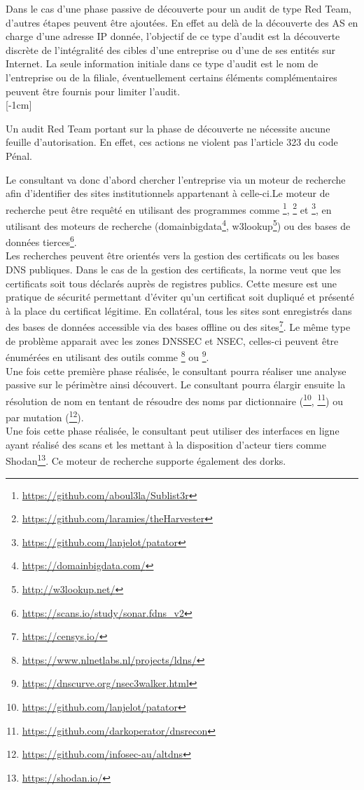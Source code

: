 \documentclass[twoside,a4paper,12pt,titlepage]{book}
\newcommand{\MarginPar}[2]{\marginnote{\scriptsize #1}[#2]}
\begin{document}
Dans le cas d'une phase passive de découverte pour un audit de type Red Team, d'autres étapes peuvent être ajoutées. En effet au delà de la découverte des AS en charge d'une adresse IP donnée, l'objectif de ce type d'audit est la découverte discrète de l'intégralité des cibles d'une entreprise ou d'une de ses entités sur Internet. La seule information initiale dans ce type d'audit est le nom de l'entreprise ou de la filiale, éventuellement certains éléments complémentaires peuvent être fournis pour limiter l'audit.\\\MarginPar{\textbf{Red Team}\index{Red Team}}{-1cm}
\begin{Pre}
Un audit Red Team portant sur la phase de découverte ne nécessite aucune feuille d'autorisation. En effet, ces actions ne violent pas l'article 323 du code Pénal.
\end{Pre}
Le consultant va donc d'abord chercher l'entreprise via un moteur de recherche afin d'identifier des sites institutionnels appartenant à celle-ci.Le moteur de recherche peut être requêté en utilisant des programmes comme \footnote{\url{https://github.com/aboul3la/Sublist3r}}, \footnote{\url{https://github.com/laramies/theHarvester}} et \footnote{\url{https://github.com/lanjelot/patator}}, en utilisant des moteurs de recherche (domainbigdata\footnote{\url{https://domainbigdata.com/}}, w3lookup\footnote{\url{http://w3lookup.net/}}) ou des bases de données tierces\footnote{\url{https://scans.io/study/sonar.fdns_v2}}.\\
Les recherches peuvent être orientés vers la gestion des certificats ou les bases DNS publiques. Dans le cas de la gestion des certificats, la norme veut que les certificats soit tous déclarés auprès de registres publics. Cette mesure est une pratique de sécurité permettant d'éviter qu'un certificat soit dupliqué et présenté à la place du certificat légitime. En collatéral, tous les sites sont enregistrés dans des bases de données accessible via des bases offline ou des sites\footnote{\url{https://censys.io/}}. Le même type de problème apparait avec les zones DNSSEC et NSEC, celles-ci peuvent être énumérées en utilisant des outils comme \footnote{\url{https://www.nlnetlabs.nl/projects/ldns/}} ou \footnote{\url{https://dnscurve.org/nsec3walker.html}}.\\
Une fois cette première phase réalisée, le consultant pourra réaliser une analyse passive sur le périmètre ainsi découvert. Le consultant pourra élargir ensuite la résolution de nom en tentant de résoudre des noms par dictionnaire (\footnote{\url{https://github.com/lanjelot/patator}}, \footnote{\url{https://github.com/darkoperator/dnsrecon}}) ou par mutation (\footnote{\url{https://github.com/infosec-au/altdns}}).\\
Une fois cette phase réalisée, le consultant peut utiliser des interfaces en ligne ayant réalisé des scans et les mettant à la disposition d'acteur tiers comme Shodan\footnote{\url{https://shodan.io/}}. Ce moteur de recherche supporte également des dorks.
\end{document}

